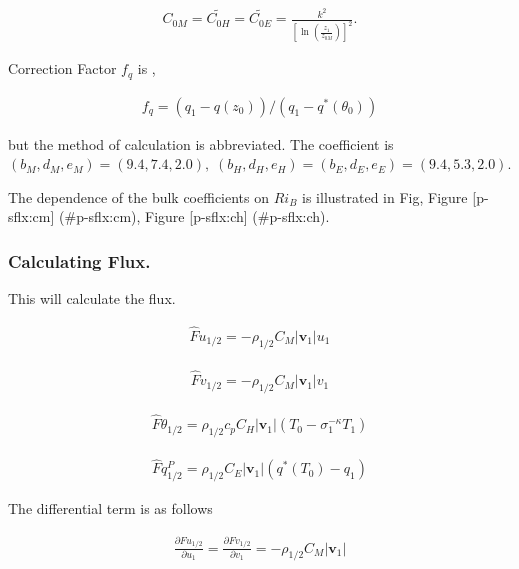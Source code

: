 \begin{eqnarray}
C_{0M}  =  \widetilde{C_{0H}}  =  \widetilde{C_{0E}}  = 
       \frac{k^2}{\left[\ln \left(\frac{z_1}{z_{0M}}\right)\right]^2 } .
\end{eqnarray}

Correction Factor \(f_q\) is ,

\begin{eqnarray}
  f_q = (q_1 - q(z_0))/(q_1 - q^{\ast}(\theta_0))
\end{eqnarray}

but the method of calculation is abbreviated. The coefficient is
\(( b_M, d_M, e_M ) = ( 9.4, 7.4, 2.0 ), \; ( b_H, d_H, e_H ) = ( b_E, d_E, e_E ) = ( 9.4, 5.3, 2.0 )\).

The dependence of the bulk coefficients on \(Ri_B\) is illustrated in
Fig, Figure {[}p-sflx:cm{]} (\#p-sflx:cm), Figure {[}p-sflx:ch{]}
(\#p-sflx:ch).

\hypertarget{calculating-flux.}{%
\subsubsection{Calculating Flux.}\label{calculating-flux.}}

This will calculate the flux.

\begin{eqnarray}
\hat{F}u_{1/2}  =  - \rho_{1/2} C_M |\mathbf{v}_1| u_1
\end{eqnarray}

\begin{eqnarray}
\hat{F}v_{1/2}  =  - \rho_{1/2} C_M |\mathbf{v}_1| v_1
\end{eqnarray}

\begin{eqnarray}
\hat{F}\theta_{1/2}  = \rho_{1/2} c_p C_H |\mathbf{v}_1| 
                    \left( T_0 - \sigma_1^{-\kappa} T_1 \right)
\end{eqnarray}

\begin{eqnarray}
\hat{F}q^P_{1/2}  =  \rho_{1/2} C_E |\mathbf{v}_1| 
                    \left( q^*(T_0) - q_1 \right)
\end{eqnarray}

The differential term is as follows

\begin{eqnarray}
\frac{\partial Fu_{1/2}}{\partial u_1} = \frac{\partial Fv_{1/2}}{\partial v_1} 
= - \rho_{1/2} C_M |\mathbf{v}_1|
\end{eqnarray}

